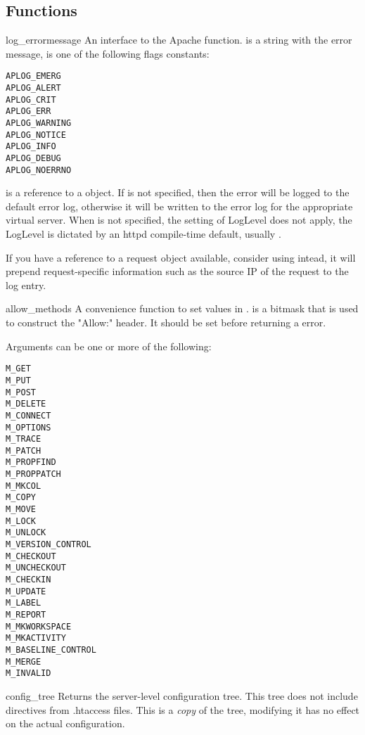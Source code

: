 \subsection{Functions\label{pyapi-apmeth}}

\begin{funcdesc}{log_error}{message}
An interface to the Apache
function.  is a string with the error message,  is
one of the following flags constants:

\begin{verbatim}
APLOG_EMERG
APLOG_ALERT
APLOG_CRIT
APLOG_ERR
APLOG_WARNING
APLOG_NOTICE
APLOG_INFO
APLOG_DEBUG
APLOG_NOERRNO
\end{verbatim}            
      
 is a reference to a  object. If
 is not specified, then the error will be logged to the
default error log, otherwise it will be written to the error log for
the appropriate virtual server. When  is not specified,
the setting of LogLevel does not apply, the LogLevel is dictated by
an httpd compile-time default, usually .

If you have a reference to a request object available, consider using
 intead, it will prepend request-specific
information such as the source IP of the request to the log entry.
\end{funcdesc}

\begin{funcdesc}{allow_methods}{}
A convenience function to set values in .
 is a bitmask that is used to construct the
"Allow:" header. It should be set before returning a
 error.

Arguments can be one or more of the following:
\begin{verbatim}
M_GET
M_PUT
M_POST
M_DELETE
M_CONNECT
M_OPTIONS
M_TRACE
M_PATCH
M_PROPFIND
M_PROPPATCH
M_MKCOL
M_COPY
M_MOVE
M_LOCK
M_UNLOCK
M_VERSION_CONTROL
M_CHECKOUT
M_UNCHECKOUT
M_CHECKIN
M_UPDATE
M_LABEL
M_REPORT
M_MKWORKSPACE
M_MKACTIVITY
M_BASELINE_CONTROL
M_MERGE
M_INVALID
\end{verbatim}

\end{funcdesc}

\begin{funcdesc}{config_tree}{}
Returns the server-level configuration tree. This tree does not
include directives from .htaccess files. This is a \emph{copy} of
the tree, modifying it has no effect on the actual configuration.
\end{funcdesc}

